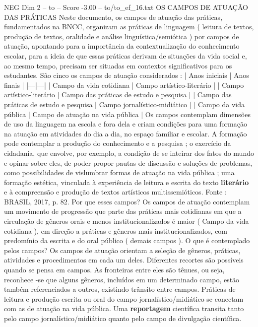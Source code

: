 \begin{textsample}{NEG Dim 2 – to – Score -3.00 – to/to\_ef\_16.txt}  \label{ex:f2_neg_157}
OS CAMPOS DE ATUAÇÃO DAS PRÁTICAS Neste documento, os campos de atuação das práticas, fundamentados na BNCC, organizam as práticas de linguagem ( leitura de textos, produção de textos, oralidade e análise linguística/semiótica ) por campos de atuação, apontando para a importância da contextualização do conhecimento escolar, para a ideia de que essas práticas derivam de situações da vida social e, ao mesmo tempo, precisam ser situadas em contextos significativos para os estudantes.
São cinco os campos de atuação considerados : | Anos iniciais | Anos finais | |---|---| | Campo da vida cotidiana | Campo artístico-literário | | Campo artístico-literário | Campo das práticas de estudo e pesquisa | | Campo das práticas de estudo e pesquisa | Campo jornalístico-midiático | | Campo da vida pública | Campo de atuação na vida pública | Os campos contemplam dimensões de uso da linguagem na escola e fora dela e criam condições para uma formação na atuação em atividades do dia a dia, no espaço familiar e escolar.
A formação pode contemplar a produção do conhecimento e a pesquisa ; o exercício da cidadania, que envolve, por exemplo, a condição de se inteirar dos fatos do mundo e opinar sobre eles, de poder propor pautas de discussão e soluções de problemas, como possibilidades de vislumbrar formas de atuação na vida pública ; uma formação estética, vinculada à experiência de leitura e escrita do texto \textbf{literário} e à compreensão e produção de textos artísticos multissemióticos.
Fonte : BRASIL, 2017, p. 82.
Por que esses campos?
Os campos de atuação contemplam um movimento de progressão que parte das práticas mais cotidianas em que a circulação de gêneros orais e menos institucionalizados é maior ( Campo da vida cotidiana ), em direção a práticas e gêneros mais institucionalizados, com predomínio da escrita e do oral público ( demais campos ).
O que é contemplado pelos campos?
Os campos de atuação orientam a seleção de gêneros, práticas, atividades e procedimentos em cada um deles.
Diferentes recortes são possíveis quando se pensa em campos.
As fronteiras entre eles são tênues, ou seja, reconhece -se que alguns gêneros, incluídos em um determinado campo, estão também referenciados a outros, existindo trânsito entre campos.
Práticas de leitura e produção escrita ou oral do campo jornalístico/midiático se conectam com as de atuação na vida pública.
Uma \textbf{reportagem} científica transita tanto pelo campo jornalístico/midiático quanto pelo campo de divulgação científica.

\end{textsample}
